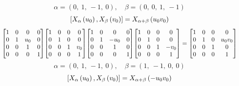 \documentclass[11pt]{article}
\theoremstyle{definition}
\begin{document}
\[
\alpha = \left( 0, \  1, \  -1, \  0\right), \quad \beta = \left( 0, \  0, \  1, \  -1\right)
\]
\[
\scaletoalign{\textwidth}{\left[ X_{\alpha}\left(u_{0}\right), X_{\beta}\left(v_{0}\right) \right] = X_{\alpha + \beta}\left(u_{0} v_{0}\right)}
\]
\[
\scaletoalign{\textwidth}{{\left[\begin{matrix}1 & 0 & 0 & 0\\0 & 1 & u_{0} & 0\\0 & 0 & 1 & 0\\0 & 0 & 0 & 1\end{matrix}\right]} {\left[\begin{matrix}1 & 0 & 0 & 0\\0 & 1 & 0 & 0\\0 & 0 & 1 & v_{0}\\0 & 0 & 0 & 1\end{matrix}\right]} {\left[\begin{matrix}1 & 0 & 0 & 0\\0 & 1 & - u_{0} & 0\\0 & 0 & 1 & 0\\0 & 0 & 0 & 1\end{matrix}\right]} {\left[\begin{matrix}1 & 0 & 0 & 0\\0 & 1 & 0 & 0\\0 & 0 & 1 & - v_{0}\\0 & 0 & 0 & 1\end{matrix}\right]} = {\left[\begin{matrix}1 & 0 & 0 & 0\\0 & 1 & 0 & u_{0} v_{0}\\0 & 0 & 1 & 0\\0 & 0 & 0 & 1\end{matrix}\right]}}
\]
\[
\alpha = \left( 0, \  1, \  -1, \  0\right), \quad \beta = \left( 1, \  -1, \  0, \  0\right)
\]
\[
\scaletoalign{\textwidth}{\left[ X_{\alpha}\left(u_{0}\right), X_{\beta}\left(v_{0}\right) \right] = X_{\alpha + \beta}\left(- u_{0} v_{0}\right)}
\]
\end{document}
